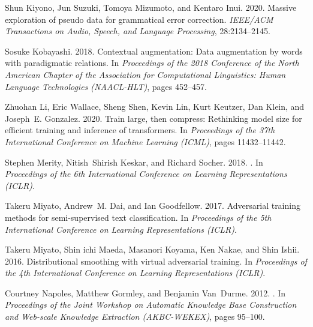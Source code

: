 \documentclass[11pt]{article}
\begin{document}
\begin{thebibliography}{47}
Shun Kiyono, Jun Suzuki, Tomoya Mizumoto, and Kentaro Inui. 2020.
\newblock Massive exploration of pseudo data for grammatical error correction.
\newblock \emph{IEEE/ACM Transactions on Audio, Speech, and Language
  Processing}, 28:2134--2145.

Sosuke Kobayashi. 2018.
\newblock Contextual augmentation: Data augmentation by words with paradigmatic
  relations.
\newblock In \emph{Proceedings of the 2018 Conference of the North {A}merican
  Chapter of the Association for Computational Linguistics: Human Language
  Technologies (NAACL-HLT)}, pages 452--457.

Zhuohan Li, Eric Wallace, Sheng Shen, Kevin Lin, Kurt Keutzer, Dan Klein, and
  Joseph~E. Gonzalez. 2020.
\newblock Train large, then compress: Rethinking model size for efficient
  training and inference of transformers.
\newblock In \emph{Proceedings of the 37th International Conference on Machine
  Learning (ICML)}, pages 11432--11442.

Stephen Merity, Nitish~Shirish Keskar, and Richard Socher. 2018.
.
\newblock In \emph{Proceedings of the 6th International Conference on Learning
  Representations (ICLR)}.

Takeru Miyato, Andrew~M. Dai, and Ian Goodfellow. 2017.
\newblock Adversarial training methods for semi-supervised text classification.
\newblock In \emph{Proceedings of the 5th International Conference on Learning
  Representations (ICLR)}.

Takeru Miyato, Shin ichi Maeda, Masanori Koyama, Ken Nakae, and Shin Ishii.
  2016.
\newblock Distributional smoothing with virtual adversarial training.
\newblock In \emph{Proceedings of the 4th International Conference on Learning
  Representations (ICLR)}.

Courtney Napoles, Matthew Gormley, and Benjamin Van~Durme. 2012.
.
\newblock In \emph{Proceedings of the Joint Workshop on Automatic Knowledge
  Base Construction and Web-scale Knowledge Extraction (AKBC-WEKEX)}, pages
  95--100.


\end{thebibliography}
\end{document}

